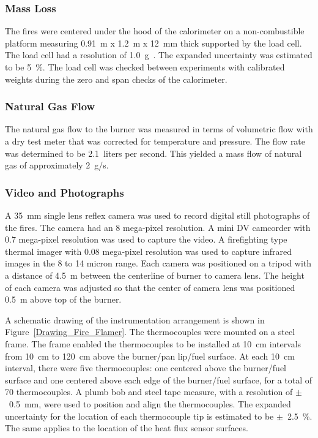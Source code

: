 \documentclass[twoside]{uocthesis}
\begin{document}
{\subsubsection{Mass Loss}

The fires were centered under the hood of the calorimeter on a non-combustible platform measuring 0.91~m x 1.2~m x 12~mm thick supported by the load cell.  The load cell had a resolution of 1.0~g~\cite{Mettler}. The expanded uncertainty was estimated to be 5~\%.  The load cell was checked between experiments with calibrated weights during the zero and span checks of the calorimeter.

\subsubsection{Natural Gas Flow}

The natural gas flow to the burner was measured in terms of volumetric flow with a dry test meter that was corrected for temperature and pressure. The flow rate was determined to be 2.1~liters per second.  This yielded a mass flow of natural gas of approximately 2~g/s.  

\subsubsection{Video and Photographs}

A 35~mm single lens reflex camera was used to record digital still photographs of the fires.  The camera had an 8 mega-pixel resolution.  A mini DV camcorder with 0.7 mega-pixel resolution was used to capture the video.  A firefighting type thermal imager with 0.08 mega-pixel resolution was used to capture infrared images in the 8 to 14 micron range.  Each camera was positioned on a tripod with a distance of 4.5~m between the centerline of burner to camera lens.  The height of each camera was adjusted so that the center of camera lens was positioned 0.5~m above top of the burner.

A schematic drawing of the instrumentation arrangement is shown in Figure~\ref{Drawing_Fire_Flamer}.  The thermocouples were mounted on a steel frame.  The frame enabled the thermocouples to be installed at 10~cm intervals from 10~cm to 120~cm above the burner/pan lip/fuel surface. At each 10~cm interval, there were five thermocouples: one centered above the burner/fuel surface and one centered above each edge of the burner/fuel surface, for a total of 70 thermocouples.  A plumb bob and steel tape measure, with a resolution of $\pm$~0.5~mm, were used to position and align the thermocouples.   The expanded uncertainty for the location of each thermocouple tip is estimated to be $\pm$~2.5~\%.  The same applies to the location of the heat flux sensor surfaces.

}
\end{document}
